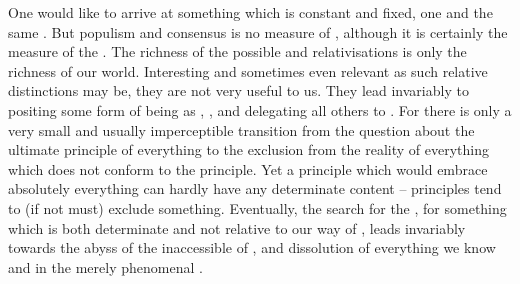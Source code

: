One would like to arrive at something which is constant and fixed, one and the
same .  But populism and consensus is no measure of
, although it is certainly the measure of the .  The richness of the possible 
and relativisations is only the richness of our world.  Interesting and
sometimes even relevant as such relative distinctions may be, they are not very
useful to us. They lead invariably to positing some form of being as , , and delegating all others to 
.  For there is only a very small and usually imperceptible
transition from the question about the ultimate principle of everything to the
exclusion from the reality of everything which does not conform to the
 principle. Yet a principle which would embrace absolutely
everything can hardly have any determinate content -- principles tend to (if not
must) exclude something.  Eventually, the search for the , for something
which is both determinate and not relative to our way of , leads
invariably towards the abyss of the inaccessible  of , and dissolution of everything we know and  in the
merely phenomenal .



